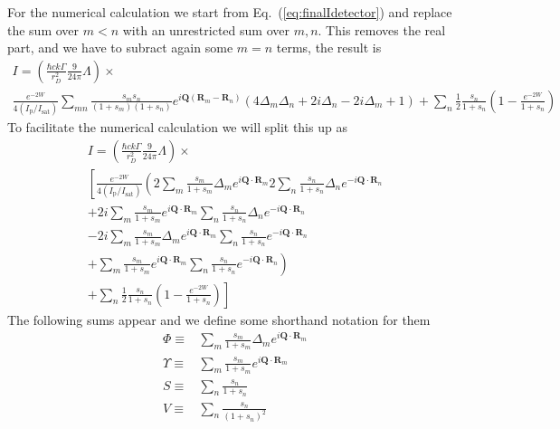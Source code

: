 \documentclass[11pt,letter]{article}
\newcommand{\bv}[1]{\ensuremath{\bm{#1}}}
\begin{document}
For the numerical calculation we start from Eq.~(\ref{eq:finalIdetector}) and replace the sum over $m<n$ with an unrestricted sum over $m,n$.  This removes the real part, and we have to subract again some $m=n$ terms, the result is 
\begin{multline}
 I  =
 \left( 
 \frac{\hbar c k \Gamma}{r_{D}^{2}}  
     \frac{9}{24\pi} \Lambda 
  \right) \times \\
  \frac{ e^{-2W} }{ 4 (I_{\mathrm{p}}/I_{\mathrm{sat}})} \sum_{mn} 
    \frac{ s_{m} s_{n} } { ( 1+s_{m} )( 1+s_{n} ) }
               e^{ i \bv{Q}( \bv{R}_{m} - \bv{R}_{n} ) }
    \left(
        4 \Delta_{m} \Delta_{n}
      + 2 i \Delta_{n} 
      - 2 i \Delta_{m}
      + 1
    \right)  
  + \sum_{n}  \frac{1}{2}
    \frac{ s_{n} } { 1 + s_{n} } \left( 1 - \frac{e^{-2W}}{1+s_{n}} \right)
\end{multline}
To facilitate the numerical calculation we will split this up as 
\begin{multline}
 I  =
 \left( 
 \frac{\hbar c k \Gamma}{r_{D}^{2}}  
     \frac{9}{24\pi} \Lambda 
  \right) \times \\
  \left[
  \frac{ e^{-2W} }{ 4 (I_{\mathrm{p}}/I_{\mathrm{sat}})}
  \left( 
    2 \sum_{m}  
    \frac{ s_{m} }
         {  1 + s_{m} } \Delta_{m} e^{i\bv{Q}\cdot\bv{R}_{m} }
    2 \sum_{n} 
    \frac{ s_{n} }
         {  1 + s_{n} } \Delta_{n} e^{-i\bv{Q}\cdot\bv{R}_{n} }  \right. \right.\\
    + 2i\sum_{m}  
    \frac{ s_{m} }
         {  1 + s_{m} } e^{i\bv{Q}\cdot\bv{R}_{m} }
    \sum_{n} 
    \frac{ s_{n} }
         {  1 + s_{n} } \Delta_{n} e^{-i\bv{Q}\cdot\bv{R}_{n} }   \\
    - 2i\sum_{m}  
    \frac{ s_{m} }
         {  1 + s_{m} } \Delta_{m} e^{i\bv{Q}\cdot\bv{R}_{m} }
    \sum_{n} 
    \frac{ s_{n} }
         {  1 + s_{n} } e^{-i\bv{Q}\cdot\bv{R}_{n} }   \\
    \left.
    +\sum_{m}  
    \frac{ s_{m} }
         {  1 + s_{m} } e^{i\bv{Q}\cdot\bv{R}_{m} }
    \sum_{n} 
    \frac{ s_{n} }
         {  1 + s_{n} } e^{-i\bv{Q}\cdot\bv{R}_{n} }  \right) \\
   \left.
  + \sum_{n}  \frac{1}{2}
    \frac{ s_{n} } { 1 + s_{n} } \left( 1 - \frac{e^{-2W}}{1+s_{n}} \right) \right]
\end{multline}
The following sums appear and we define some shorthand notation for them
\begin{align} 
     \Phi \equiv & 
     \sum_{m}  
    \frac{ s_{m} }
         {  1 + s_{m} } \Delta_{m} e^{i\bv{Q}\cdot\bv{R}_{m} } \\
     \Upsilon \equiv &
     \sum_{m}  
    \frac{ s_{m} }
         {  1 + s_{m} } e^{i\bv{Q}\cdot\bv{R}_{m} } \\
     S \equiv & 
     \sum_{n}  
     \frac{ s_{n} } { 1 + s_{n} }  \\
     V \equiv & 
     \sum_{n}  
     \frac{ s_{n} } { (1 + s_{n})^{2}}  \\
\end{align}
\end{document}
